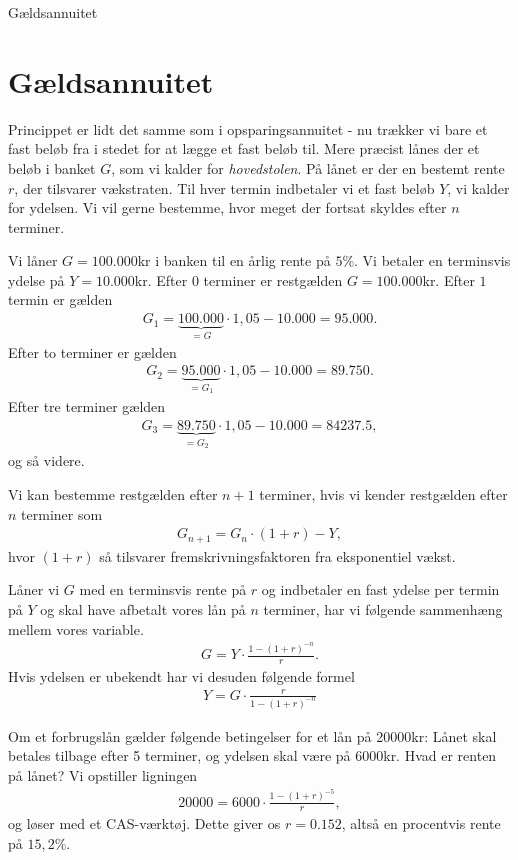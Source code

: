 
\begin{center}
\Huge
Gældsannuitet
\end{center}

\section*{Gældsannuitet}

Princippet er lidt det samme som i opsparingsannuitet - nu trækker vi bare et fast beløb fra i stedet for at lægge et fast beløb til. Mere præcist lånes der et beløb i banket $G$, som vi kalder for \textit{hovedstolen}. På lånet er der en bestemt rente $r$, der tilsvarer vækstraten. Til hver termin indbetaler vi et fast beløb $Y$, vi kalder for ydelsen. Vi vil gerne bestemme, hvor meget der fortsat skyldes efter $n$ terminer. 
\begin{exa}
Vi låner $G=100.000$kr i banken til en årlig rente på $5\%$. Vi betaler en terminsvis ydelse på $Y=10.000$kr.
Efter $0$ terminer er restgælden $G=100.000$kr. Efter $1$ termin er gælden
\begin{align*}
G_1 = \underbrace{100.000}_{=G}\cdot 1,05 - 10.000 = 95.000.
\end{align*}   
Efter to terminer er gælden 
\begin{align*}
G_2 = \underbrace{95.000}_{=G_1}\cdot 1,05-10.000 = 89.750.
\end{align*}
Efter tre terminer gælden 
\begin{align*}
G_3 = \underbrace{89.750}_{=G_2} \cdot 1,05 - 10.000 = 84237.5,
\end{align*}
og så videre. 
\end{exa}
Vi kan bestemme restgælden efter $n+1$ terminer, hvis vi kender restgælden efter $n$ terminer som
\begin{align*}
G_{n+1} = G_{n}\cdot (1+r) - Y, 
\end{align*}
hvor $(1+r)$ så tilsvarer fremskrivningsfaktoren fra eksponentiel vækst. 
\begin{setn}
Låner vi $G$ med en terminsvis rente på $r$ og indbetaler en fast ydelse per termin på $Y$ og skal have afbetalt vores lån på $n$ terminer, har vi følgende sammenhæng mellem vores variable.
\begin{align*}
G = Y\cdot \frac{1-(1+r)^{-n}}{r}.
\end{align*}
Hvis ydelsen er ubekendt har vi desuden følgende formel
\begin{align*}
Y = G\cdot \frac{r}{1-(1+r)^{-n}}
\end{align*}
\end{setn}
\begin{exa}
Om et forbrugslån gælder følgende betingelser for et lån på 20000kr: Lånet skal betales tilbage efter 5 terminer, og ydelsen skal være på 6000kr. Hvad er renten på lånet? Vi opstiller ligningen
\begin{align*}
20000 = 6000\cdot \frac{1-(1+r)^{-5}}{r},
\end{align*}
og løser med et CAS-værktøj. Dette giver os $r = 0.152$, altså en procentvis rente på $15,2\%$.
\end{exa}
